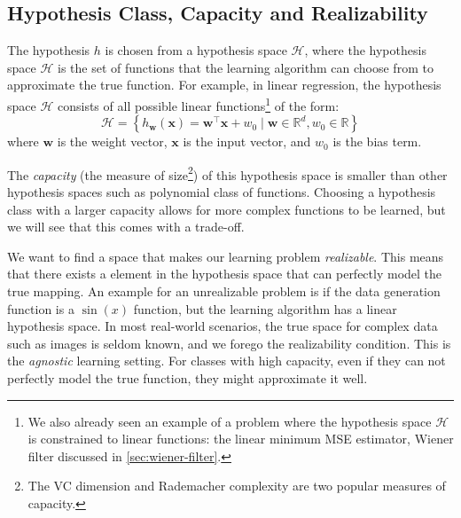 \subsection{Hypothesis Class, Capacity and Realizability}
The hypothesis $h$ is chosen from a hypothesis space $\mathcal{H}$, where the hypothesis space $\mathcal{H}$ is the set of functions that the learning algorithm can choose from to approximate the true function. 
For example, in linear regression, the hypothesis space $\mathcal{H}$ consists of all possible  linear functions\footnote{We also already seen an example of a problem where the hypothesis space $\mathcal{H}$ is constrained to linear functions: the linear minimum \gls{MSE} estimator, Wiener filter discussed in \cref{sec:wiener-filter}.} of the form:
\begin{equation}\label{eq:linear-hypothesis}
   \mathcal{H} =  \left\{ h_{\mathbf{w}}(\mathbf{x}) = \mathbf{w}^\top \mathbf{x} + w_0 \mid \mathbf{w} \in \mathbb{R}^d, w_0 \in \mathbb{R} \right\}
\end{equation}
where $\mathbf{w}$ is the weight vector, $\mathbf{x}$ is the input vector, and $w_0$ is the bias term. 

The \textit{capacity} (the measure of size\footnote{The VC dimension and Rademacher complexity are two popular measures of capacity.}) of this hypothesis space is smaller than other  hypothesis spaces such as polynomial class of functions. Choosing a hypothesis class with a larger capacity allows for more complex functions to be learned, but we will see that this comes with a trade-off.

We want to find a space that makes our learning problem \textit{realizable}. This means that there exists a element  in the hypothesis space that can perfectly model the true mapping. An example for an unrealizable problem is if the data generation function is a $\sin(x)$ function, but the learning algorithm has a linear hypothesis space. In most real-world scenarios, the true space for complex data such as images is seldom known, and we forego the realizability condition. This is the \textit{agnostic} learning setting. For classes with high capacity, even if they can not perfectly model the true function, they might approximate it well.

